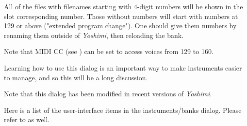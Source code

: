    All of the files with
   filenames starting with 4-digit numbers will be shown in the slot
   corresponding number.  Those without numbers will start with numbers at
   129 or above ("extended program change").  One should
   give them numbers by renaming them outside of \textsl{Yoshimi},
   then reloading the bank.

   Note that MIDI CC
   (see )
   can be set to access voices from 129 to 160.

   Learning how to use this dialog is an important way to make
   instruments easier to manage, and so this will be a long discussion.




   


   Note that this dialog has been modified in recent versions of
   \textsl{Yoshimi}.

   Here is a list of the user-interface items in the instruments/banks dialog.
   Please refer to 
    as well.

